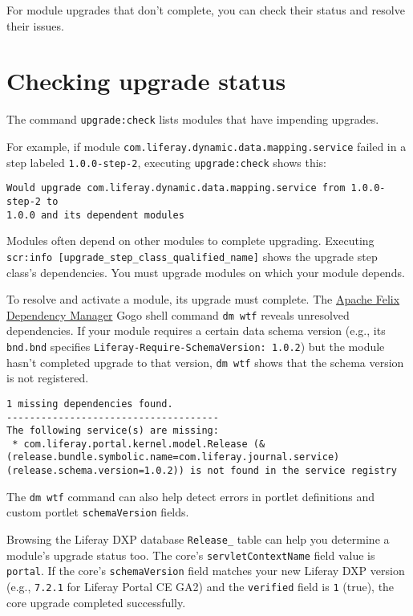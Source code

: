 For module upgrades that don't complete, you can check their status and
resolve their issues.

\section{Checking upgrade status}\label{checking-upgrade-status}

The command \texttt{upgrade:check} lists modules that have impending
upgrades.

For example, if module \texttt{com.liferay.dynamic.data.mapping.service}
failed in a step labeled \texttt{1.0.0-step-2}, executing
\texttt{upgrade:check} shows this:

\begin{verbatim}
Would upgrade com.liferay.dynamic.data.mapping.service from 1.0.0-step-2 to
1.0.0 and its dependent modules
\end{verbatim}

Modules often depend on other modules to complete upgrading. Executing
\texttt{scr:info\ {[}upgrade\_step\_class\_qualified\_name{]}} shows the
upgrade step class's dependencies. You must upgrade modules on which
your module depends.

To resolve and activate a module, its upgrade must complete. The
\href{http://felix.apache.org/documentation/subprojects/apache-felix-dependency-manager/tutorials/leveraging-the-shell.html}{Apache
Felix Dependency Manager} Gogo shell command \texttt{dm\ wtf} reveals
unresolved dependencies. If your module requires a certain data schema
version (e.g., its \texttt{bnd.bnd} specifies
\texttt{Liferay-Require-SchemaVersion:\ 1.0.2}) but the module hasn't
completed upgrade to that version, \texttt{dm\ wtf} shows that the
schema version is not registered.

\begin{verbatim}
1 missing dependencies found.
-------------------------------------
The following service(s) are missing:
 * com.liferay.portal.kernel.model.Release (&(release.bundle.symbolic.name=com.liferay.journal.service)(release.schema.version=1.0.2)) is not found in the service registry
\end{verbatim}

The \texttt{dm\ wtf} command can also help detect errors in portlet
definitions and custom portlet \texttt{schemaVersion} fields.

Browsing the Liferay DXP database \texttt{Release\_} table can help you
determine a module's upgrade status too. The core's
\texttt{servletContextName} field value is \texttt{portal}. If the
core's \texttt{schemaVersion} field matches your new Liferay DXP version
(e.g., \texttt{7.2.1} for Liferay Portal CE GA2) and the
\texttt{verified} field is \texttt{1} (true), the core upgrade completed
successfully.

